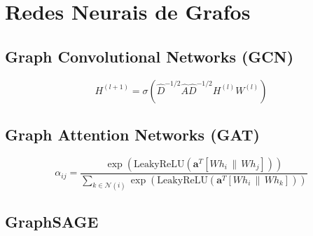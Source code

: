 \section{Redes Neurais de Grafos}
\label{sec:gnns}


\subsection{Graph Convolutional Networks (GCN)}
\label{sec:gcn}

%

\begin{equation}
H^{(l+1)} = \sigma\left(\hat{D}^{-1/2}\hat{A}\hat{D}^{-1/2} H^{(l)} W^{(l)}\right)
\label{eq:gcn}
\end{equation}


\subsection{Graph Attention Networks (GAT)}
\label{sec:gat}

%

\begin{equation}
\alpha_{ij} = \frac{\exp\left(\mathrm{LeakyReLU}(\mathbf{a}^T [W h_i \,\|\, W h_j])\right)}{\sum_{k \in \mathcal{N}(i)} \exp\left(\mathrm{LeakyReLU}(\mathbf{a}^T [W h_i \,\|\, W h_k])\right)}
\label{eq:gat_alpha}
\end{equation}


\subsection{GraphSAGE}
\label{sec:sage}

%
%

